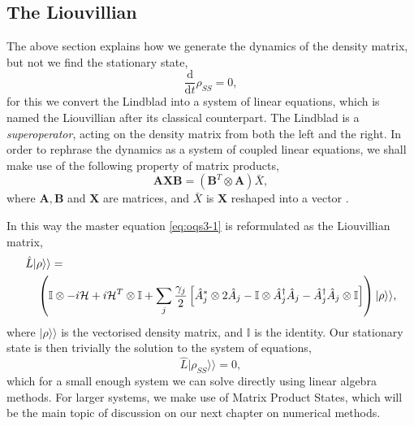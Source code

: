 \subsection{The Liouvillian}
The above section explains how we generate the dynamics of the density matrix, but not we find the stationary state,
\begin{equation}
	\frac{\mathrm{d}}{\mathrm{d}t}\rho_{SS} = 0,
	\label{eq:oqs4-1}
\end{equation}
for this we convert the Lindblad into a system of linear equations, which is named the Liouvillian after its classical counterpart. The Lindblad is a \emph{superoperator}, acting on the density matrix from both the left and the right. In order to rephrase the dynamics as a system of coupled linear equations, we shall make use of the following property of matrix products,
\begin{equation}
	 \mathbf{A}\mathbf{X}\mathbf{B} = \left(\mathbf{B}^{T} \otimes \mathbf{A}\right)\bar{X},
	 \label{eq:oqs4-2}
\end{equation}
 where \(\mathbf{A}, \mathbf{B}\) and \(\mathbf{X}\) are matrices, and \(\bar{X}\) is \(\mathbf{X}\) reshaped into a vector \cite{Macedo2013,Roth1934}. 
 
 In this way the master equation \cref{eq:oqs3-1} is reformulated as the Liouvillian matrix,
 \begin{align}
 	&\hat{L}|\rho \rangle \rangle = \notag \\ 
 	&\quad \left( \mathbb{I} \otimes -i\mathcal{H} + i\mathcal{H}^{T} \otimes \mathbb{I} + \sum_{j} \frac{\gamma_{j}}{2} \left[ \hat{A}_{j}^{*} \otimes 2\hat{A}_{j} - \mathbb{I} \otimes \hat{A}_{j}^{\dagger}\hat{A}_{j} - \hat{A}_{j}^{\dagger}\hat{A}_{j} \otimes \mathbb{I} \right]\right)|\rho\rangle\rangle,
 	\label{eq:oqs4-3}
 \end{align}
 where \(|\rho \rangle\rangle\) is the vectorised density matrix, and \(\mathbb{I}\) is the identity. Our stationary state is then trivially the solution to the system of equations,
 \begin{equation}
 	\hat{L} |\rho_{SS} \rangle\rangle = 0,
 	\label{eq:oqs4-4}
 \end{equation}
 which for a small enough system we can solve directly using linear algebra methods. For larger systems, we make use of Matrix Product States, which will be the main topic of discussion on our next chapter on numerical methods.